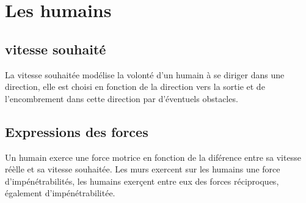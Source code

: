 \section{Les humains}
%
\label{samuel1}
\subsection{vitesse souhaité}
La vitesse souhaitée modélise la volonté d'un humain à se diriger dans une direction, elle est choisi en fonction de la direction vers la sortie et de l'encombrement dans cette direction par d'éventuels obstacles.\cite{lemercier}
%
\subsection{Expressions des forces}
Un humain exerce une force motrice en fonction de la diférence entre sa vitesse réèlle et sa vitesse souhaitée. Les murs exercent sur les humains une force d'impénétrabilités, les humains exerçent entre eux des forces réciproques, également d'impénétrabilitée.
